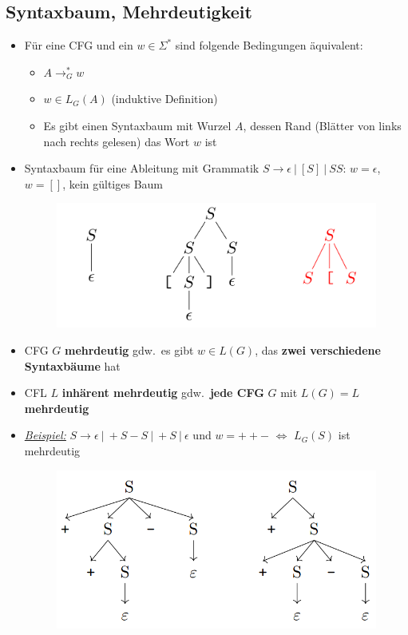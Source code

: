 \documentclass[ieeetran]{article}
\begin{document}
\subsection{Syntaxbaum, Mehrdeutigkeit} %
\label{sub:syntaxbaum}
\begin{itemize}
\item Für eine CFG und ein $w \in \Sigma^*$ sind folgende Bedingungen äquivalent:
	\begin{itemize}
	  \item $A \rightarrow_G^* w$
	\item $w \in L_G(A)$ (induktive Definition)
	\item Es gibt einen Syntaxbaum mit Wurzel $A$, dessen Rand
(Blätter von links nach rechts gelesen) das Wort $w$ ist


\end{itemize}
\item Syntaxbaum für eine Ableitung mit Grammatik $S \rightarrow \epsilon \ | \ [S] \ | \ SS$: $w = \epsilon$, $w = []$, kein gültiges Baum
\begin{figure}[h!]
  \centering
  \includegraphics[width=0.4\linewidth]{syntaxbaum}
  \label{fig:syntaxbaum}
\end{figure}

\item CFG $G$ \textbf{mehrdeutig} gdw.\ es gibt $w \in L(G)$, das \textbf{zwei verschiedene Syntaxbäume} hat
\item CFL $L$ \textbf{inhärent mehrdeutig} gdw.\ \textbf{jede CFG} $G$ mit $L(G) = L$ \textbf{mehrdeutig} 
\item \textit{\underline{Beispiel:}} $S \rightarrow \epsilon \ | \ +S-S \ | \ +S \ | \ \epsilon$ und $w = ++-$ $\Leftrightarrow$ $L_G(S)$ ist mehrdeutig
	\begin{figure}[h!]
	  \centering
	  \includegraphics[width=0.4\linewidth]{syntaxbaum1.png}
	  \label{fig:syntaxbaum1_png}
	\end{figure}



\end{itemize}
\end{document}
